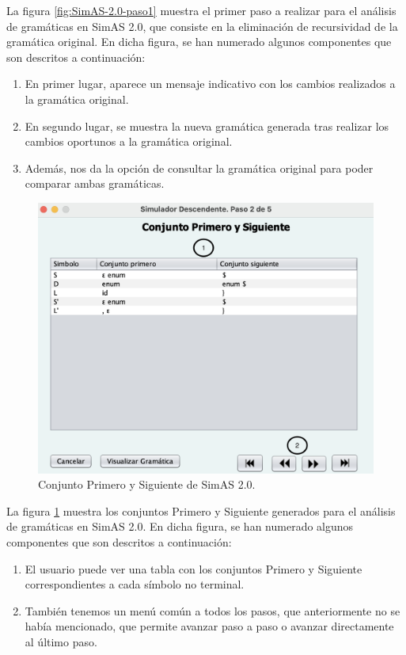 La figura \ref{fig:SimAS-2.0-paso1} muestra el primer paso a realizar para el análisis de gramáticas en SimAS 2.0, que consiste en la eliminación de recursividad de la gramática original. En dicha figura, se han numerado algunos componentes que son descritos a continuación:
 \begin{enumerate}
     \item En primer lugar, aparece un mensaje indicativo con los cambios realizados a la gramática original.
     \item En segundo lugar, se muestra la nueva gramática generada tras realizar los cambios oportunos a la gramática original.
     \item Además, nos da la opción de consultar la gramática original para poder comparar ambas gramáticas.
 \end{enumerate}

 \begin{figure}[p]
 	\begin{center}
      \includegraphics[scale=0.5]{figuras/Cap3/SimAS2/paso2.png} 
       \caption{Conjunto Primero y Siguiente de SimAS 2.0.}\label{fig:SimAS-2.0-paso2}
 	\end{center}
\end{figure}

\newpage
La figura \ref{fig:SimAS-2.0-paso2} muestra los conjuntos Primero y Siguiente generados para el análisis de gramáticas en SimAS 2.0. En dicha figura, se han numerado algunos componentes que son descritos a continuación:
 \begin{enumerate}
     \item El usuario puede ver una tabla con los conjuntos Primero y Siguiente correspondientes a cada símbolo no terminal.
     \item También tenemos un menú común a todos los pasos, que anteriormente no se había mencionado, que permite avanzar paso a paso o  avanzar directamente al último paso.
 \end{enumerate}

